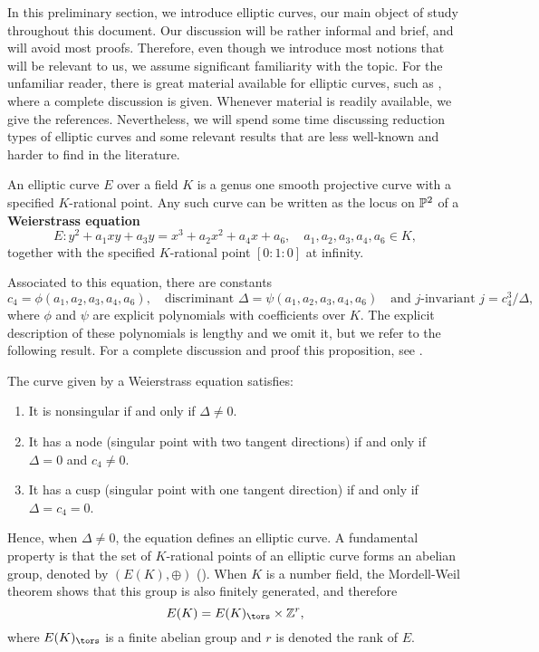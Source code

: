 
In this preliminary section, we introduce elliptic curves, our main object of study throughout this document. Our discussion will be rather informal and brief, and will avoid most proofs. Therefore, even though we introduce most notions that will be relevant to us, we assume significant familiarity with the topic. For the unfamiliar reader, there is great material available for elliptic curves, such as \cite{S1}, where a complete discussion is given. Whenever material is readily available, we give the references. Nevertheless, we will spend some time discussing reduction types of elliptic curves and some relevant results that are less well-known and harder to find in the literature. 

An elliptic curve $E$ over a field $K$ is a genus one smooth projective curve with a specified $K$-rational point. Any such curve can be written as the locus on $\mathbb{P}^2$ of a \textbf{Weierstrass equation}
\begin{equation}\label{eqn_gen_elliptic}
    E: y^2+a_1xy+a_3y=x^3+a_2x^2+a_4x+a_6,\quad a_1,a_2,a_3,a_4,a_6\in K,
\end{equation}
together with the specified $K$-rational point $[0:1:0]$ at infinity.

Associated to this equation, there are constants
$$c_4=\phi(a_1,a_2,a_3,a_4,a_6),\quad\text{discriminant } \Delta=\psi(a_1,a_2,a_3,a_4,a_6)\quad \text{and $j$-invariant }j=c_4^3/\Delta,$$
where $\phi$ and $\psi$ are explicit polynomials with coefficients over $K$. 
The explicit description of these polynomials is lengthy and we omit it, but we refer to the following result. For a complete discussion and proof this proposition, see \cite[\S III.1]{S1}.

\begin{prop}\label{prop_nodecusp}
    The curve given by a Weierstrass equation satisfies:
    \begin{enumerate}
        \item It is nonsingular if and only if $\Delta\neq0$.
        \item It has a node (singular point with two tangent directions) if and only if $\Delta=0$ and $c_4 \neq 0$.
        \item It has a cusp (singular point with one tangent direction) if and only if $\Delta= c_4 = 0$. 
    \end{enumerate}
\end{prop}

Hence, when $\Delta\neq0$, the equation defines an elliptic curve. A fundamental property is that the set of $K$-rational points of an elliptic curve forms an abelian group, denoted by $(E(K),\oplus)$ (\cite[\S III.2]{S1}). When $K$ is a number field, the Mordell-Weil theorem shows that this group is also finitely generated, and therefore 
$$E(K)=E(K)_{\tors}\times\ZZ^r,$$
where $E(K)_{\tors}$ is a finite abelian group and $r$ is denoted the rank of $E$.
